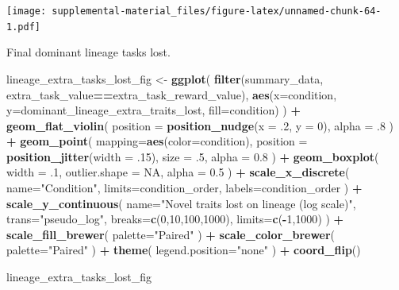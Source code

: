 \documentclass[]{book}
\newenvironment{Shaded}{\begin{snugshade}}{\end{snugshade}}
\newcommand{\DataTypeTok}[1]{\textcolor[rgb]{0.13,0.29,0.53}{#1}}
\newcommand{\DecValTok}[1]{\textcolor[rgb]{0.00,0.00,0.81}{#1}}
\newcommand{\FloatTok}[1]{\textcolor[rgb]{0.00,0.00,0.81}{#1}}
\newcommand{\KeywordTok}[1]{\textcolor[rgb]{0.13,0.29,0.53}{\textbf{#1}}}
\newcommand{\NormalTok}[1]{#1}
\newcommand{\OperatorTok}[1]{\textcolor[rgb]{0.81,0.36,0.00}{\textbf{#1}}}
\newcommand{\OtherTok}[1]{\textcolor[rgb]{0.56,0.35,0.01}{#1}}
\newcommand{\StringTok}[1]{\textcolor[rgb]{0.31,0.60,0.02}{#1}}
\begin{document}
\texttt{[image: supplemental-material\_files/figure-latex/unnamed-chunk-64-1.pdf]}

Final dominant lineage tasks lost.

\begin{Shaded}
\begin{Highlighting}[]
\NormalTok{lineage_extra_tasks_lost_fig <-}\StringTok{ }\KeywordTok{ggplot}\NormalTok{(}
    \KeywordTok{filter}\NormalTok{(summary_data, extra_task_value}\OperatorTok{==}\NormalTok{extra_task_reward_value),}
    \KeywordTok{aes}\NormalTok{(}\DataTypeTok{x=}\NormalTok{condition, }\DataTypeTok{y=}\NormalTok{dominant_lineage_extra_traits_lost, }\DataTypeTok{fill=}\NormalTok{condition)}
\NormalTok{  ) }\OperatorTok{+}
\StringTok{  }\KeywordTok{geom_flat_violin}\NormalTok{(}
    \DataTypeTok{position =} \KeywordTok{position_nudge}\NormalTok{(}\DataTypeTok{x =} \FloatTok{.2}\NormalTok{, }\DataTypeTok{y =} \DecValTok{0}\NormalTok{),}
    \DataTypeTok{alpha =} \FloatTok{.8}
\NormalTok{  ) }\OperatorTok{+}
\StringTok{  }\KeywordTok{geom_point}\NormalTok{(}
    \DataTypeTok{mapping=}\KeywordTok{aes}\NormalTok{(}\DataTypeTok{color=}\NormalTok{condition),}
    \DataTypeTok{position =} \KeywordTok{position_jitter}\NormalTok{(}\DataTypeTok{width =} \FloatTok{.15}\NormalTok{),}
    \DataTypeTok{size =} \FloatTok{.5}\NormalTok{,}
    \DataTypeTok{alpha =} \FloatTok{0.8}
\NormalTok{  ) }\OperatorTok{+}
\StringTok{  }\KeywordTok{geom_boxplot}\NormalTok{(}
    \DataTypeTok{width =} \FloatTok{.1}\NormalTok{,}
    \DataTypeTok{outlier.shape =} \OtherTok{NA}\NormalTok{,}
    \DataTypeTok{alpha =} \FloatTok{0.5}
\NormalTok{  ) }\OperatorTok{+}
\StringTok{  }\KeywordTok{scale_x_discrete}\NormalTok{(}
    \DataTypeTok{name=}\StringTok{"Condition"}\NormalTok{,}
    \DataTypeTok{limits=}\NormalTok{condition_order,}
    \DataTypeTok{labels=}\NormalTok{condition_order}
\NormalTok{  ) }\OperatorTok{+}
\StringTok{  }\KeywordTok{scale_y_continuous}\NormalTok{(}
    \DataTypeTok{name=}\StringTok{"Novel traits lost on lineage (log scale)"}\NormalTok{,}
    \DataTypeTok{trans=}\StringTok{"pseudo_log"}\NormalTok{,}
    \DataTypeTok{breaks=}\KeywordTok{c}\NormalTok{(}\DecValTok{0}\NormalTok{,}\DecValTok{10}\NormalTok{,}\DecValTok{100}\NormalTok{,}\DecValTok{1000}\NormalTok{),}
    \DataTypeTok{limits=}\KeywordTok{c}\NormalTok{(}\OperatorTok{-}\DecValTok{1}\NormalTok{,}\DecValTok{1000}\NormalTok{)}
\NormalTok{  ) }\OperatorTok{+}
\StringTok{  }\KeywordTok{scale_fill_brewer}\NormalTok{(}
    \DataTypeTok{palette=}\StringTok{"Paired"}
\NormalTok{  ) }\OperatorTok{+}
\StringTok{  }\KeywordTok{scale_color_brewer}\NormalTok{(}
    \DataTypeTok{palette=}\StringTok{"Paired"}
\NormalTok{  ) }\OperatorTok{+}
\StringTok{  }\KeywordTok{theme}\NormalTok{(}
    \DataTypeTok{legend.position=}\StringTok{"none"}
\NormalTok{  ) }\OperatorTok{+}
\StringTok{  }\KeywordTok{coord_flip}\NormalTok{()}

\NormalTok{lineage_extra_tasks_lost_fig}
\end{Highlighting}
\end{Shaded}
\end{document}
